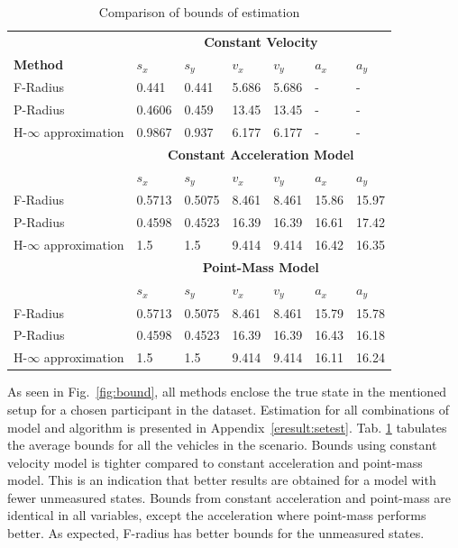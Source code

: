 \begin{table}[htbp]
\caption{Comparison of bounds of estimation\\}
	\centering
	\renewcommand{\arraystretch}{1.1}
	\small	
	\begin{tabular}{l l l l l l l}
		\toprule 
		& \multicolumn{6}{c}{\textbf{Constant Velocity}}\\
		\textbf{Method} & \textbf{$s_x$} & \textbf{$s_y$} & \textbf{$v_x$} & \textbf{$v_y$} & \textbf{$a_x$} & \textbf{$a_y$}\\ \midrule
		F-Radius & 0.441 & 0.441 & 5.686 & 5.686 & - & -\\
		P-Radius & 0.4606 & 0.459 & 13.45 & 13.45 & - &	-\\
		H-$\infty$ approximation & 0.9867 &	0.937 &	6.177 & 6.177 & - &-\\
		
		& \multicolumn{6}{c}{\textbf{Constant Acceleration Model}}\\
		 & \textbf{$s_x$} & \textbf{$s_y$} & \textbf{$v_x$} & \textbf{$v_y$} & \textbf{$a_x$} & \textbf{$a_y$}\\ \midrule
		F-Radius & 0.5713 &	0.5075 &	8.461	& 8.461 &	15.86 &	15.97\\
		P-Radius & 0.4598 &	0.4523 &	16.39 &	16.39 &	16.61 &	17.42\\
		H-$\infty$ approximation & 1.5 & 1.5 & 9.414 &	9.414 &	16.42 &	16.35\\
		
		& \multicolumn{6}{c}{\textbf{Point-Mass Model}}\\
		 & \textbf{$s_x$} & \textbf{$s_y$} & \textbf{$v_x$} & \textbf{$v_y$} & \textbf{$a_x$} & \textbf{$a_y$}\\ \midrule
		F-Radius & 0.5713 &	0.5075 &	8.461	& 8.461 &	15.79 &	15.78\\
		P-Radius & 0.4598 &	0.4523 &	16.39 &	16.39 &	16.43 &	16.18\\
		H-$\infty$ approximation & 1.5 & 1.5 & 9.414 &	9.414 &	16.11 &	16.24\\
		\bottomrule
	\end{tabular}
	\label{tab:bound}
\end{table}
As seen in Fig.~\ref{fig:bound}, all methods enclose the true state in the mentioned setup for a chosen participant in the dataset. Estimation for all combinations of model and algorithm is presented in Appendix~\ref{eresult:setest}. 
Tab. \ref{tab:bound} tabulates the average bounds for all the vehicles in the scenario. Bounds using constant velocity model is tighter compared to constant acceleration and point-mass model. This is an indication that better results are obtained for a model with fewer unmeasured states. Bounds from constant acceleration and point-mass are identical in all variables, except the acceleration where point-mass performs better. As expected, F-radius has better bounds for the unmeasured states. 

